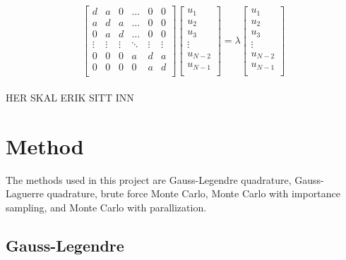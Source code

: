 \documentclass{article}
\begin{document}
  \begin{equation*} \label{eq:fullmatrixeq}
    \begin{bmatrix}
        d & a & 0 & \dots & 0 & 0 \\
        a & d & a & \dots & 0 & 0 \\
        0 & a & d & \dots & 0 & 0 \\
        \vdots & \vdots & \vdots & \ddots & \vdots & \vdots \\
        0 & 0 & 0 & a & d & a \\
        0 & 0 & 0 & 0 & a & d \\
    \end{bmatrix}
    \begin{bmatrix}
        u_1 \\
        u_2 \\
        u_3 \\
        \vdots \\
        u_{N-2} \\
        u_{N-1} \\
    \end{bmatrix}
      = \lambda
    \begin{bmatrix}
        u_1 \\
        u_2 \\
        u_3 \\
        \vdots \\
        u_{N-2} \\
        u_{N-1} \\
    \end{bmatrix}
  \end{equation*} \\

HER SKAL ERIK SITT INN

\vspace{1cm}

\section{Method} \label{sec:Method}

The methods used in this project are Gauss-Legendre quadrature, Gauss-Laguerre quadrature, brute force Monte Carlo, Monte Carlo with importance sampling, and Monte Carlo with parallization.

\subsection{Gauss-Legendre}
\end{document}
